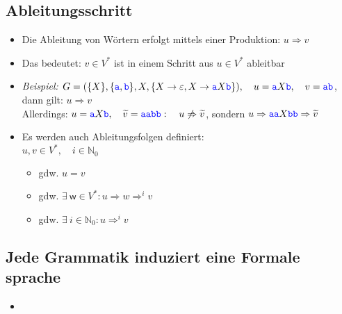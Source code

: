 \documentclass{article}
\newcommand{\Nz}{{\mathbb{N}_0}} %
\newcommand{\blue}[1]{\textcolor{blue}{#1}}
\newcommand{\important}[1]{\textcolor{importantColor}{#1}}
\newcommand{\example}[1]{\textit{Beispiel: }#1}
\newcommand{\word}[1]{\blue{\texttt{#1}}}
\newcommand{\set}[1]{\{#1\}}
\newcommand{\w}{\textsf{w}}
\begin{document}
\subsection{Ableitungsschritt}
\begin{itemize}
    \item Die Ableitung von Wörtern erfolgt mittels einer \important{Produktion}: \important{$u\Rightarrow v$}
    \item Das bedeutet: $v\in V^*$ ist in einem Schritt aus $u\in V^*$ ableitbar
    \item \example{$G=(\set{X}, \set{\word{a},\word{b}}, X, \set{X\rightarrow\varepsilon, X\rightarrow\word{a}X\word{b}}), \quad u=\word{a}X\word{b},\quad v=\word{ab}$, dann gilt: $u\Rightarrow v$\\
    Allerdings: ${u} = \word{a}X\word{b},\quad \widetilde{v}=\word{aabb}:\quad u\not\Rightarrow \widetilde{v}$, sondern $u\Rightarrow \word{aa}X\word{bb} \Rightarrow \widetilde{v}$}
    \item Es werden auch \important{Ableitungsfolgen definiert}:\\$u,v\in V^*, \quad i\in \Nz$
    \begin{itemize}
        \item \makebox[1.5cm][l]{\important{$u\Rightarrow^0v$}} gdw. $u=v$
        \item \makebox[1.5cm][l]{\important{$u\Rightarrow^{i+1}v$}} gdw. $\exists\: \w \in V^*: u\Rightarrow w\Rightarrow^iv$
        \item \makebox[1.5cm][l]{\important{$u\Rightarrow^*v$}} gdw. $\exists\: i\in \Nz: u\Rightarrow^iv$
    \end{itemize}
\end{itemize}
\subsection{Jede Grammatik induziert eine Formale sprache}
\begin{itemize}
    \item 
\end{itemize}
\end{document}
